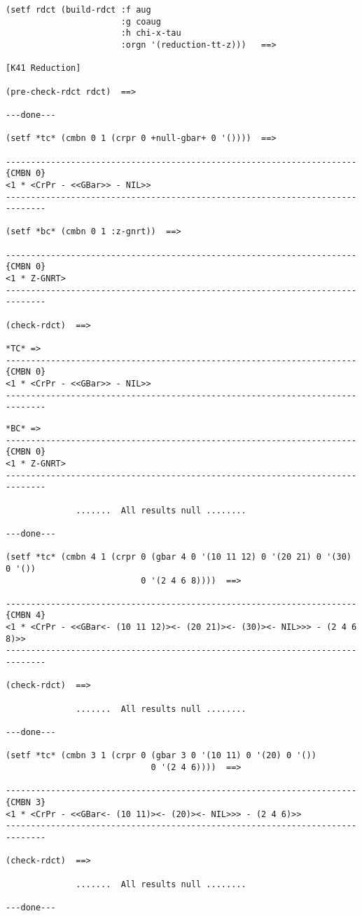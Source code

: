 {\footnotesize\begin{verbatim}
(setf rdct (build-rdct :f aug 
                       :g coaug 
                       :h chi-x-tau 
                       :orgn '(reduction-tt-z)))   ==>

[K41 Reduction]

(pre-check-rdct rdct)  ==>

---done---

(setf *tc* (cmbn 0 1 (crpr 0 +null-gbar+ 0 '())))  ==>

----------------------------------------------------------------------{CMBN 0}
<1 * <CrPr - <<GBar>> - NIL>>
------------------------------------------------------------------------------

(setf *bc* (cmbn 0 1 :z-gnrt))  ==>

----------------------------------------------------------------------{CMBN 0}
<1 * Z-GNRT>
------------------------------------------------------------------------------

(check-rdct)  ==>

*TC* => 
----------------------------------------------------------------------{CMBN 0}
<1 * <CrPr - <<GBar>> - NIL>>
------------------------------------------------------------------------------
\end{verbatim}}
\newpage
{\footnotesize\begin{verbatim}
*BC* => 
----------------------------------------------------------------------{CMBN 0}
<1 * Z-GNRT>
------------------------------------------------------------------------------

              .......  All results null ........

---done---

(setf *tc* (cmbn 4 1 (crpr 0 (gbar 4 0 '(10 11 12) 0 '(20 21) 0 '(30) 0 '())
                           0 '(2 4 6 8))))  ==>

----------------------------------------------------------------------{CMBN 4}
<1 * <CrPr - <<GBar<- (10 11 12)><- (20 21)><- (30)><- NIL>>> - (2 4 6 8)>>
------------------------------------------------------------------------------

(check-rdct)  ==>

              .......  All results null ........

---done---

(setf *tc* (cmbn 3 1 (crpr 0 (gbar 3 0 '(10 11) 0 '(20) 0 '())
                             0 '(2 4 6))))  ==>

----------------------------------------------------------------------{CMBN 3}
<1 * <CrPr - <<GBar<- (10 11)><- (20)><- NIL>>> - (2 4 6)>>
------------------------------------------------------------------------------

(check-rdct)  ==>

              .......  All results null ........

---done---
\end{verbatim}}
